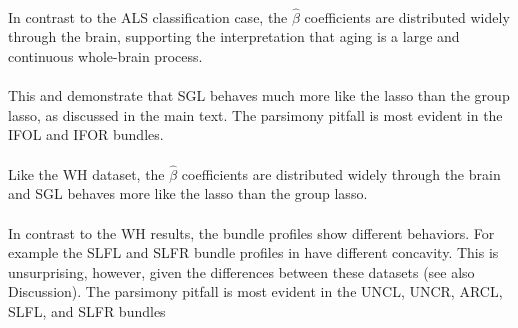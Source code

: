 \documentclass[10pt,letterpaper]{article}
\begin{document}
\paragraph*{}
\label{S3_Fig}
In contrast to the ALS classification case,
the $\hat{\beta}$ coefficients are distributed widely through the brain, supporting the interpretation that aging is a large and continuous whole-brain process.

\paragraph*{}
\label{S4_Fig}
This and  demonstrate that SGL behaves much more like the
lasso than the group lasso, as discussed in the main text. The parsimony pitfall
is most evident in the IFOL and IFOR bundles.

\paragraph*{}
\label{S5_Fig}
Like the WH dataset, the $\hat{\beta}$
coefficients are distributed widely through the brain and SGL behaves more like
the lasso than the group lasso.

\paragraph*{}
\label{S6_Fig}
In contrast to the WH results, the bundle
profiles show different behaviors. For example the SLFL and SLFR bundle profiles
in have different concavity. This is unsurprising, however, given the
differences between these datasets (see also Discussion). The parsimony pitfall
is most evident in the UNCL, UNCR, ARCL, SLFL, and SLFR bundles
\end{document}
